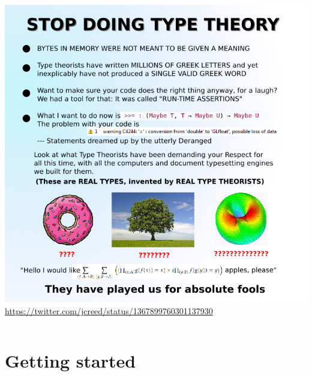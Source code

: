 \documentclass{beamer}
\begin{document}
\begin{frame}[fragile]
\begin{columns}[c]
        \centering
        \includegraphics[width=\textwidth]{stop-doing-type-theory.png}
        \tiny\color{gray}\url{https://twitter.com/jcreed/status/1367899760301137930}
    \end{columns}
  \end{frame}


\section{Getting started}

\iffalse
\end{document}
